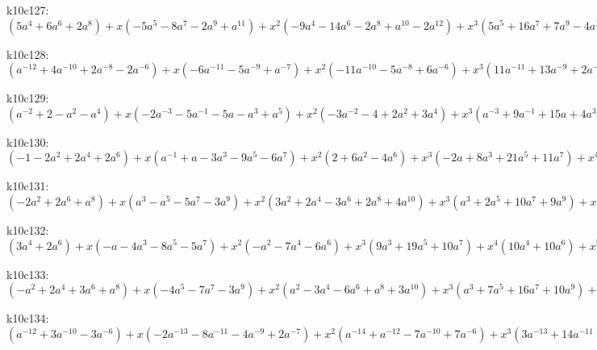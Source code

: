 k10c127: $ (5a^{4}+6a^{6}+2a^{8}) +x(-5a^{5}-8a^{7}-2a^{9}+a^{11}) +x^{2}(-9a^{4}-14a^{6}-2a^{8}+a^{10}-2a^{12}) +x^{3}(5a^{5}+16a^{7}+7a^{9}-4a^{11}) +x^{4}(3a^{4}+11a^{6}+4a^{8}-3a^{10}+a^{12}) +x^{5}(-3a^{5}-10a^{7}-5a^{9}+2a^{11}) +x^{6}(-4a^{6}-2a^{8}+2a^{10}) +x^{7}(a^{5}+3a^{7}+2a^{9}) +x^{8}(a^{6}+a^{8}) $

k10c128: $ (a^{-12}+4a^{-10}+2a^{-8}-2a^{-6}) +x(-6a^{-11}-5a^{-9}+a^{-7}) +x^{2}(-11a^{-10}-5a^{-8}+6a^{-6}) +x^{3}(11a^{-11}+13a^{-9}+2a^{-7}) +x^{4}(12a^{-10}+7a^{-8}-5a^{-6}) +x^{5}(-6a^{-11}-10a^{-9}-4a^{-7}) +x^{6}(-6a^{-10}-5a^{-8}+a^{-6}) +x^{7}(a^{-11}+2a^{-9}+a^{-7}) +x^{8}(a^{-10}+a^{-8}) $

k10c129: $ (a^{-2}+2-a^{2}-a^{4}) +x(-2a^{-3}-5a^{-1}-5a-a^{3}+a^{5}) +x^{2}(-3a^{-2}-4+2a^{2}+3a^{4}) +x^{3}(a^{-3}+9a^{-1}+15a+4a^{3}-3a^{5}) +x^{4}(2a^{-2}+8-6a^{4}) +x^{5}(-4a^{-1}-11a-6a^{3}+a^{5}) +x^{6}(-4-2a^{2}+2a^{4}) +x^{7}(a^{-1}+3a+2a^{3}) +x^{8}(1+a^{2}) $

k10c130: $ (-1-2a^{2}+2a^{4}+2a^{6}) +x(a^{-1}+a-3a^{3}-9a^{5}-6a^{7}) +x^{2}(2+6a^{2}-4a^{6}) +x^{3}(-2a+8a^{3}+21a^{5}+11a^{7}) +x^{4}(-7a^{2}+7a^{6}) +x^{5}(a-8a^{3}-15a^{5}-6a^{7}) +x^{6}(2a^{2}-3a^{4}-5a^{6}) +x^{7}(2a^{3}+3a^{5}+a^{7}) +x^{8}(a^{4}+a^{6}) $

k10c131: $ (-2a^{2}+2a^{6}+a^{8}) +x(a^{3}-a^{5}-5a^{7}-3a^{9}) +x^{2}(3a^{2}+2a^{4}-3a^{6}+2a^{8}+4a^{10}) +x^{3}(a^{3}+2a^{5}+10a^{7}+9a^{9}) +x^{4}(-2a^{4}-2a^{6}-4a^{8}-4a^{10}) +x^{5}(a^{3}-3a^{5}-12a^{7}-8a^{9}) +x^{6}(2a^{4}-a^{8}+a^{10}) +x^{7}(2a^{5}+4a^{7}+2a^{9}) +x^{8}(a^{6}+a^{8}) $

k10c132: $ (3a^{4}+2a^{6}) +x(-a-4a^{3}-8a^{5}-5a^{7}) +x^{2}(-a^{2}-7a^{4}-6a^{6}) +x^{3}(9a^{3}+19a^{5}+10a^{7}) +x^{4}(10a^{4}+10a^{6}) +x^{5}(-6a^{3}-12a^{5}-6a^{7}) +x^{6}(-6a^{4}-6a^{6}) +x^{7}(a^{3}+2a^{5}+a^{7}) +x^{8}(a^{4}+a^{6}) $

k10c133: $ (-a^{2}+2a^{4}+3a^{6}+a^{8}) +x(-4a^{5}-7a^{7}-3a^{9}) +x^{2}(a^{2}-3a^{4}-6a^{6}+a^{8}+3a^{10}) +x^{3}(a^{3}+7a^{5}+16a^{7}+10a^{9}) +x^{4}(2a^{4}+6a^{6}-4a^{10}) +x^{5}(-4a^{5}-13a^{7}-9a^{9}) +x^{6}(-4a^{6}-3a^{8}+a^{10}) +x^{7}(a^{5}+3a^{7}+2a^{9}) +x^{8}(a^{6}+a^{8}) $

k10c134: $ (a^{-12}+3a^{-10}-3a^{-6}) +x(-2a^{-13}-8a^{-11}-4a^{-9}+2a^{-7}) +x^{2}(a^{-14}+a^{-12}-7a^{-10}+7a^{-6}) +x^{3}(3a^{-13}+14a^{-11}+11a^{-9}) +x^{4}(-a^{-12}+5a^{-10}+a^{-8}-5a^{-6}) +x^{5}(-8a^{-11}-11a^{-9}-3a^{-7}) +x^{6}(a^{-12}-3a^{-10}-3a^{-8}+a^{-6}) +x^{7}(2a^{-11}+3a^{-9}+a^{-7}) +x^{8}(a^{-10}+a^{-8}) $

